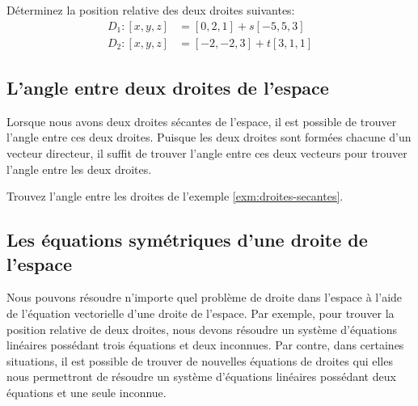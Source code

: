 \documentclass[]{book}
\theoremstyle{definition}
\theoremstyle{definition}
\theoremstyle{definition}
\theoremstyle{remark}
\let\BeginKnitrBlock\begin \let\EndKnitrBlock\end
\begin{document}
\BeginKnitrBlock{example}
\protect\hypertarget{exm:droites-secantes}{}{\label{exm:droites-secantes} }Déterminez la position relative des deux droites suivantes:
\begin{align*}
D_1 : [x,y,z] &= [0,2,1]+s[-5,5,3] \\
D_2 : [x,y,z] &= [-2,-2,3]+t[3,1,1]
\end{align*}
\EndKnitrBlock{example}

\hypertarget{langle-entre-deux-droites-de-lespace}{%
\subsection{L'angle entre deux droites de l'espace}\label{langle-entre-deux-droites-de-lespace}}

Lorsque nous avons deux droites sécantes de l'espace, il est possible de trouver l'angle entre ces deux droites. Puisque les deux droites sont formées chacune d'un vecteur directeur, il suffit de trouver l'angle entre ces deux vecteurs pour trouver l'angle entre les deux droites.

\BeginKnitrBlock{example}
\protect\hypertarget{exm:unnamed-chunk-209}{}{\label{exm:unnamed-chunk-209} }Trouvez l'angle entre les droites de l'exemple \ref{exm:droites-secantes}.
\EndKnitrBlock{example}

\hypertarget{les-uxe9quations-symuxe9triques-dune-droite-de-lespace}{%
\subsection{Les équations symétriques d'une droite de l'espace}\label{les-uxe9quations-symuxe9triques-dune-droite-de-lespace}}

Nous pouvons résoudre n'importe quel problème de droite dans l'espace à l'aide de l'équation vectorielle d'une droite de l'espace.
Par exemple, pour trouver la position relative de deux droites, nous devons résoudre un système d'équations linéaires possédant trois équations et deux inconnues. Par contre, dans certaines situations, il est possible de trouver de nouvelles équations de droites qui elles nous permettront de résoudre un système d'équations linéaires possédant deux équations et une seule inconnue.
\end{document}
